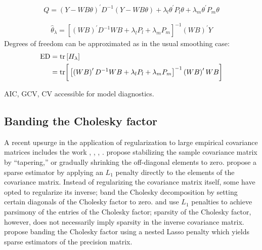 \documentclass[12pt]{article}
\theoremstyle{definition}
\begin{document}
\begin{equation*} %
Q = \left( Y - WB\theta\right)^\prime D^{-1} \left( Y - WB\theta\right) + \lambda_l  \theta^\prime P_l \theta + \lambda_m \theta^\prime P_m \theta 
\end{equation*}


\begin{align*} \label{eq:tensor-pspline-normal-equations}
\hat{\theta}_\lambda = \left[ \left(WB\right)^\prime D^{-1}WB +  \lambda_l P_l+ \lambda_m P_m\right]^{-1} \left(W B\right)^\prime Y
\end{align*}
Degrees of freedom can be approximated as in the usual smoothing case:
\begin{align*}
\textup{ED} &= \textup{tr} \left[ H_\lambda \right]\\
&= \textup{tr}\bigg[\left[ \left(WB\right)^\prime D^{-1}WB +  \lambda_l P_l+ \lambda_m P_m\right]^{-1} \left(W B\right)^\prime WB  \bigg]
\end{align*}

AIC, GCV, CV accessible for model diagnostics.

 


\subsection{Banding the Cholesky factor}

A recent upsurge in the application of regularization to large empirical covariance matrices includes the work \citet{huang2006covariance}, \citet{furrer2007estimation}, \citet{fan2008high}, \citet{ledoit2004well}.  \citet{furrer2007estimation} propose stabilizing the sample covariance matrix by ``tapering,'' or gradually shrinking the off-diagonal elements to zero. \citet{d2008first} propose a sparse estimator by applying an $L_1$ penalty directly to the elements of the covariance matrix. Instead of regularizing the covariance matrix itself, some have opted to regularize its inverse;  \cite{wu2003nonparametric} band the Cholesky decomposition  by setting certain diagonals of the Cholesky factor to zero. \citet{huang2006covariance} and \citet{levina2008sparse} use $L_1$ penalties to achieve parsimony of the entries of the Cholesky factor; sparsity of the Cholesky factor, however, does not necessarily imply sparsity in the inverse covariance matrix. \citet{levina2008sparse} propose banding the Cholesky factor using a nested Lasso penalty which yields sparse estimators of the precision matrix.  
\end{document}
